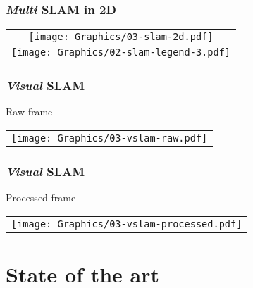 \documentclass{beamerthesis}
\newcommand{\aemph}[1]{\color{color5}\emph{#1}\hspace{0.1em}\color{color2}}
\begin{document}
\begin{frame}\frametitle{\aemph{Multi} SLAM in 2D}
	\centering

	\begin{tabular}{c}
		\texttt{[image: Graphics/03-slam-2d.pdf]}\\
		\texttt{[image: Graphics/02-slam-legend-3.pdf]}
	\end{tabular}
\end{frame}

\begin{frame}\frametitle{\aemph{Visual} SLAM}
	\centering
	Raw frame\vspace*{-2em}

	\begin{tabular}{c}
		\texttt{[image: Graphics/03-vslam-raw.pdf]}\\
	\end{tabular}
\end{frame}

\begin{frame}\frametitle{\aemph{Visual} SLAM}
	\centering
	Processed frame\vspace*{-2em}

	\begin{tabular}{c}
		\texttt{[image: Graphics/03-vslam-processed.pdf]}\\
	\end{tabular}
\end{frame}

\section{State of the art}
\end{document}
